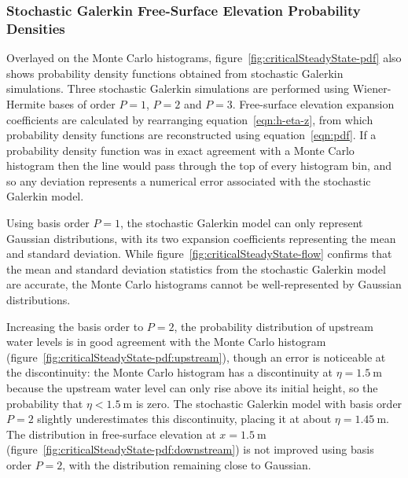 \subsubsection{Stochastic Galerkin Free-Surface Elevation Probability Densities}
Overlayed on the Monte Carlo histograms, figure~\ref{fig:criticalSteadyState-pdf} also shows probability density functions obtained from stochastic Galerkin simulations.
Three stochastic Galerkin simulations are performed using Wiener-Hermite bases of order $P=1$, $P=2$ and $P=3$.
Free-surface elevation expansion coefficients are calculated by rearranging equation~\eqref{eqn:h-eta-z}, from which probability density functions are reconstructed using equation~\eqref{eqn:pdf}.
If a probability density function was in exact agreement with a Monte Carlo histogram then the line would pass through the top of every histogram bin, and so any deviation represents a numerical error associated with the stochastic Galerkin model.

Using basis order $P=1$, the stochastic Galerkin model can only represent Gaussian distributions, with its two expansion coefficients representing the mean and standard deviation.
While figure~\ref{fig:criticalSteadyState-flow} confirms that the mean and standard deviation statistics from the stochastic Galerkin model are accurate, the Monte Carlo histograms cannot be well-represented by Gaussian distributions.

Increasing the basis order to $P=2$, the probability distribution of upstream water levels is in good agreement with the Monte Carlo histogram (figure~\ref{fig:criticalSteadyState-pdf:upstream}), though an error is noticeable at the discontinuity:
the Monte Carlo histogram has a discontinuity at $\eta = \SI{1.5}{\meter}$ because the upstream water level can only rise above its initial height, so the probability that $\eta < \SI{1.5}{\meter}$ is zero.
The stochastic Galerkin model with basis order $P = 2$ slightly underestimates this discontinuity, placing it at about $\eta = \SI{1.45}{\meter}$.
The distribution in free-surface elevation at $x = \SI{1.5}{\meter}$ (figure~\ref{fig:criticalSteadyState-pdf:downstream}) is not improved using basis order $P=2$, with the distribution remaining close to Gaussian.


